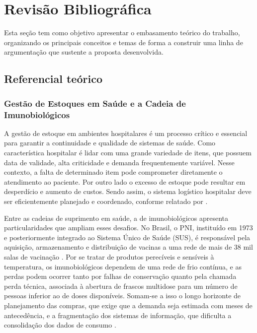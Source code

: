 \documentclass[
    12pt,                %
    openright,           %
    oneside,             %
    a4paper,             %
    english,             %
    brazil               %
]{abntex2}
\begin{document}
\chapter{Revisão Bibliográfica}
\label{cap:revisao}

Esta seção tem como objetivo apresentar o embasamento teórico do trabalho, organizando os principais conceitos e temas de forma a construir uma linha de argumentação que sustente a proposta desenvolvida.

\section{Referencial teórico}
\label{sec:referencial}

\subsection{Gestão de Estoques em Saúde e a Cadeia de Imunobiológicos}
\label{subsec:gestao_estoques}

A gestão de estoque em ambientes hospitalares é um processo crítico e essencial para garantir a continuidade e qualidade de sistemas de saúde. Como característica hospitalar é lidar com uma grande variedade de itens, que possuem data de validade, alta criticidade e demanda frequentemente variável. Nesse contexto, a falta de determinado item pode comprometer diretamente o atendimento ao paciente. Por outro lado o excesso de estoque pode resultar em desperdício e aumento de custos. Sendo assim, o sistema logístico hospitalar deve ser eficientemente planejado e coordenado, conforme relatado por .

Entre as cadeias de suprimento em saúde, a de imunobiológicos apresenta particularidades que ampliam esses desafios. No Brasil, o PNI, instituído em 1973 e posteriormente integrado ao Sistema Único de Saúde (SUS), é responsável pela aquisição, armazenamento e distribuição de vacinas a uma rede de mais de 38 mil salas de vacinação \cite{Lopes2022}. Por se tratar de produtos perecíveis e sensíveis à temperatura, os imunobiológicos dependem de uma rede de frio contínua, e as perdas podem ocorrer tanto por falhas de conservação quanto pela chamada perda técnica, associada à abertura de frascos multidose para um número de pessoas inferior ao de doses disponíveis. Somam-se a isso o longo horizonte de planejamento das compras, que exige que a demanda seja estimada com meses de antecedência, e a fragmentação dos sistemas de informação, que dificulta a consolidação dos dados de consumo \cite{Lopes2022}.
\end{document}
